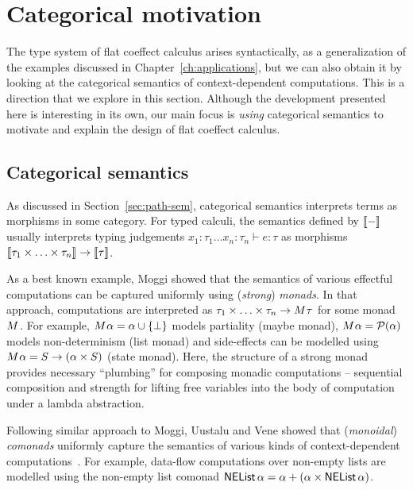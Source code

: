 \section{Categorical motivation}
\label{sec:flat-semantics}

The type system of flat coeffect calculus arises syntactically, as a generalization of the examples 
discussed in Chapter~\ref{ch:applications}, but we can also obtain it by looking at the categorical 
semantics of context-dependent computations. This is a direction that we explore in this section. 
Although the development presented here is interesting in its own, our main focus is \emph{using} 
categorical semantics to motivate and explain the design of flat coeffect calculus.


\subsection{Categorical semantics}

As discussed in Section~\ref{sec:path-sem}, categorical semantics interprets terms as morphisms
in some category. For typed calculi, the semantics defined by $\llbracket - \rrbracket$ usually interprets typing 
judgements $x_1 \!:\! \tau_1 \ldots x_n \!:\! \tau_n \vdash e: \tau$ as morphisms 
$\llbracket \tau_1 \times \ldots \times \tau_n \rrbracket \rightarrow \llbracket \tau \rrbracket$.

As a best known example, Moggi \cite{monad-notions} showed that the semantics of various effectful 
computations can be captured uniformly using (\emph{strong}) \emph{monads}. In that 
approach, computations are interpreted as $\tau_1 \times \ldots \times \tau_n \rightarrow M^{}\tau$
for some monad $M^{}$. For example, $M^{}\alpha = \alpha \cup \{ \bot \}$ models 
partiality (maybe monad), $M^{}\alpha = \mathcal{P}(\alpha)$ models non-determinism (list 
monad) and side-effects can be modelled using $M^{}\alpha = S \rightarrow (\alpha \times S)$ 
(state monad). Here, the structure of a strong monad provides necessary ``plumbing'' for composing 
monadic computations -- sequential composition and strength for lifting free variables into the
body of computation under a lambda abstraction.

Following similar approach to Moggi, Uustalu and Vene \cite{comonads-notions} showed that 
(\emph{monoidal}) \emph{comonads} uniformly capture the semantics of various kinds of context-dependent 
computations~\cite{comonads-notions}. For example, data-flow computations over non-empty lists
are modelled using the non-empty list comonad $\ident{NEList}\,\alpha = \alpha + (\alpha \times \ident{NEList}\,\alpha)$.

